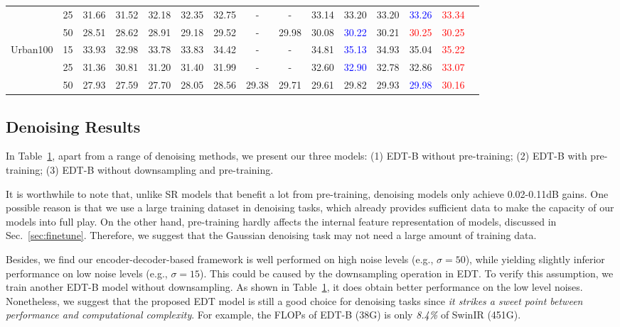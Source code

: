 \documentclass[runningheads]{llncs}
\begin{document}
\begin{table}[t]
\begin{center}
{\begin{tabular}{| c | c | c | c | c | c | c | c | c | c | c | c | c | c | c |}
					~ & 25 & 31.66 & 31.52 & 32.18 & 32.35 & 32.75 & - & - & 33.14 & 33.20 & 33.20 & \textcolor{blue}{33.26} & \textcolor{red}{33.34} \\
					~ & 50 & 28.51 & 28.62 & 28.91 & 29.18 & 29.52 & - & 29.98 & 30.08 & \textcolor{blue}{30.22} & 30.21 & \textcolor{red}{30.25} & \textcolor{red}{30.25} \\
					\hline
					\multirow{3}{*}{Urban100} & 15 & 33.93 & 32.98 & 33.78 & 33.83 & 34.42 & - & - & 34.81 & \textcolor{blue}{35.13} & 34.93 & 35.04 & \textcolor{red}{35.22} \\
					~ & 25 & 31.36 & 30.81 & 31.20 & 31.40 & 31.99 & - & - & 32.60 & \textcolor{blue}{32.90} & 32.78 & 32.86 & \textcolor{red}{33.07} \\
					~ & 50 & 27.93 & 27.59 & 27.70 & 28.05 & 28.56 & 29.38 & 29.71 & 29.61 & 29.82 & 29.93 & \textcolor{blue}{29.98} & \textcolor{red}{30.16} \\
					\hline
				\end{tabular}
			}
		\end{center}
		\vspace{-0.25in}
		\label{tab:denoise}
	\end{table}
	
	\subsection{Denoising Results}
	\label{sec:denoising}
	
	In Table~\ref{tab:denoise}, apart from a range of denoising methods, we present our three models: (1) EDT-B without pre-training; (2) EDT-B with pre-training; (3) EDT-B without downsampling and pre-training.
	
	It is worthwhile to note that, unlike SR models that benefit a lot from pre-training, denoising models only achieve 0.02-0.11dB gains. One possible reason is that we use a large training dataset in denoising tasks, which already provides sufficient data to make the capacity of our models into full play. On the other hand, pre-training hardly affects the internal feature representation of models, discussed in Sec.~\ref{sec:finetune}. Therefore, we suggest that the Gaussian denoising task may not need a large amount of training data.


	Besides, we find our encoder-decoder-based framework is well performed on high noise levels (e.g., $\sigma=50$), while yielding slightly inferior performance on low noise levels (e.g., $\sigma=15$). This could be caused by the downsampling operation in EDT. To verify this assumption, we train another EDT-B model without downsampling. As shown in Table~\ref{tab:denoise}, it does obtain better performance on the low level noises. Nonetheless, we suggest that the proposed EDT model is still a good choice for denoising tasks since \textit{it strikes a sweet point between performance and computational complexity}. For example, the FLOPs of EDT-B (38G) is only \textit{8.4\%} of SwinIR (451G).
	
\end{document}

